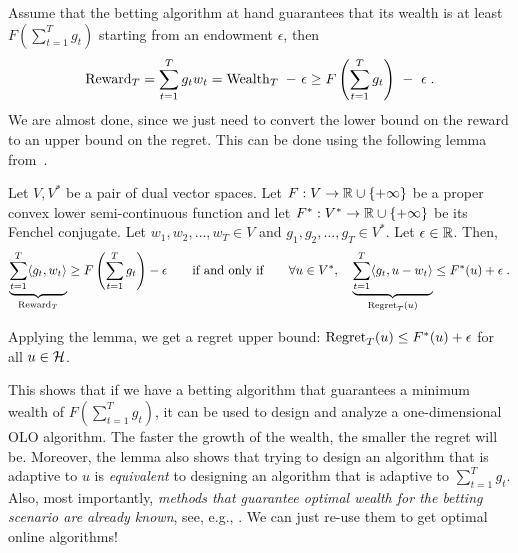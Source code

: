 Assume that the betting algorithm at hand guarantees that its wealth is at
least $F(\sum_{t=1}^T g_t)$ starting from an endowment $\epsilon$, then
\vspace{-.1cm}
\begin{equation}
\label{equation:one-dimensional-olo-reward-lower-bound}
\Reward_T
= \sum_{t=1}^T g_t w_t
= \Wealth_T \ - \ \epsilon \ge F\left(\sum_{t=1}^T g_t \right) \ - \ \epsilon \; .
\end{equation}
We are almost done, since we just need to convert the lower bound on the reward
to an upper bound on the regret. This can be done using the following lemma
from~\cite{McMahan-Orabona-2014}.
\begin{lemma}
\label{lemma:reward-regret}
Let $V,V^*$ be a pair of dual vector spaces. Let $F:V \to \mathbb{R} \cup \{+\infty\}$
be a proper convex lower semi-continuous function and let $F^*:V^* \to \mathbb{R} \cup
\{+\infty\}$ be its Fenchel conjugate. Let $w_1, w_2, \dots, w_T \in V$ and
$g_1, g_2, \dots, g_T \in V^*$. Let $\epsilon \in \mathbb{R}$. Then,
\[
\underbrace{\sum_{t=1}^T \langle g_t, w_t \rangle}_{\operatorname{Reward}_T} \ge F\left( \sum_{t=1}^T g_t \right) -\epsilon
\qquad \text{if and only if} \qquad
\forall u \in V^*, \quad
\underbrace{\sum_{t=1}^T \langle g_t, u - w_t\rangle}_{\operatorname{Regret}_T(u)} \le F^*(u) + \epsilon\; .
\]
\end{lemma}
\vspace{-.1cm}
Applying the lemma, we get a regret upper bound:
$\operatorname{Regret}_T(u) \le F^*(u) + \epsilon$ for all $u \in \mathcal{H}$.

This shows that if we have a betting algorithm that guarantees a minimum wealth
of $F(\sum_{t=1}^T g_t)$, it can be used to design and analyze a
one-dimensional \ac{OLO} algorithm. The faster the growth of the wealth, the
smaller the regret will be.  Moreover, the lemma also shows that trying to
design an algorithm that is adaptive to $u$ is \emph{equivalent} to designing
an algorithm that is adaptive to $\sum_{t=1}^T g_t$.  Also, most importantly,
\emph{methods that guarantee optimal wealth for the betting scenario are
already known}, see, e.g., \cite[Chapter 9]{Cesa-Bianchi-Lugosi-2006}. We can
just re-use them to get optimal online algorithms!
